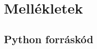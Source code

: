\section{Mellékletek}
\subsection{Python forráskód}
\inputminted[breaklines,linenos,fontsize=\footnotesize]{python}{generate_solution.py}

